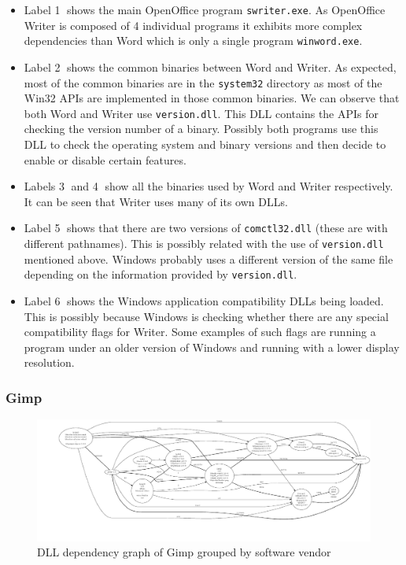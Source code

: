 \begin{itemize}

\item Label \textcircled{1} shows the main OpenOffice program
\texttt{swriter.exe}.
As OpenOffice Writer is composed of 4 individual programs it
exhibits more complex dependencies than
Word which is only a single program \texttt{winword.exe}.

\item Label \textcircled{2} shows the common binaries between Word and Writer.
As expected, most of the common binaries
are in the \texttt{system32} directory as
most of the Win32 APIs are implemented in those common binaries.
We can observe that both Word and Writer use \texttt{version.dll}.
This DLL contains the APIs for checking the version number of a binary.
Possibly both programs use this DLL to check the operating system and
binary versions and then decide to enable or disable certain features.

\item Labels \textcircled{3} and \textcircled{4} show all the binaries
used by Word and Writer respectively. It can be seen that Writer
uses many of its own DLLs.

\item Label \textcircled{5} shows that there are two
versions of \texttt{comctl32.dll}
(these are with different pathnames). This is possibly related
with the use of \texttt{version.dll} mentioned above.
Windows probably uses a different version of the
same file depending on the information provided by \texttt{version.dll}.

\item Label \textcircled{6} shows the Windows application
compatibility DLLs being loaded.
This is possibly because Windows is checking whether there are any special
compatibility flags for Writer.
Some examples of such flags are running a program under an older version of
Windows and running with a lower display resolution.

\end{itemize}

\subsubsection{Gimp}

\begin{figure}
\includegraphics[width=1.0\textwidth]{depvis/gimp-vendor.pdf}
\caption{DLL dependency graph of Gimp grouped by software vendor}
\label{fig:gimp-vendor}
\end{figure}

